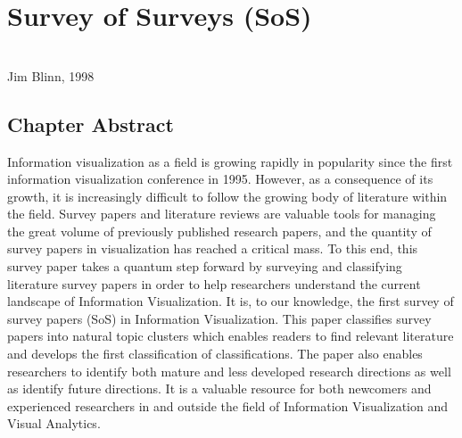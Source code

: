 \chapter{Survey of Surveys (SoS)} 
\label{chap:SoS}
 \cite{mcnabb2017sos} \\
{Jim Blinn, 1998}

\newpage
{\footnotesize \hypersetup{linkcolor=black}
\minitoc}
\newpage


\vspace*{4cm}
\section*{Chapter Abstract}
Information visualization as a field is growing rapidly in popularity since the first information visualization conference in 1995. However, as a consequence of its growth, it is increasingly difficult to follow the growing body of literature within the field. Survey papers and literature reviews are valuable tools for managing the great volume of previously published research papers, and the quantity of survey papers in visualization  has reached a critical mass.  To this end, this survey paper takes a quantum step forward by surveying and  classifying literature survey papers in order to help researchers understand the current landscape of Information Visualization. It is, to our knowledge, the first survey of survey papers (SoS) in Information Visualization. This paper classifies survey papers into natural topic clusters which enables readers to find relevant literature and develops the first classification of classifications. The paper also enables researchers to identify both mature and less developed research directions as well as identify future directions. It is a valuable resource for both newcomers and experienced researchers in and outside the field of Information Visualization and Visual Analytics.
\newpage

